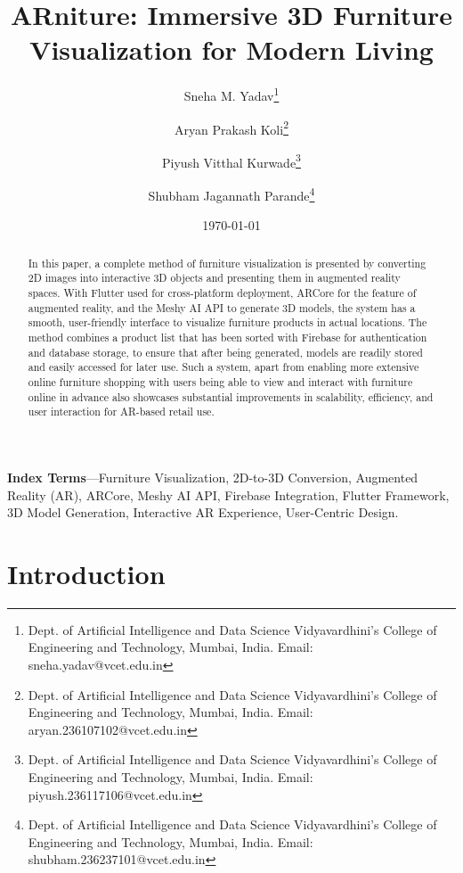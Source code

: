 \documentclass[12pt, a4paper]{article}
\title{ARniture: Immersive 3D Furniture Visualization for Modern Living}
\author{Sneha M. Yadav\thanks{Dept. of Artificial Intelligence and Data Science Vidyavardhini's College of Engineering and Technology, Mumbai, India. Email: sneha.yadav@vcet.edu.in} \and Aryan Prakash Koli\thanks{Dept. of Artificial Intelligence and Data Science Vidyavardhini's College of Engineering and Technology, Mumbai, India. Email: aryan.236107102@vcet.edu.in} \and Piyush Vitthal Kurwade\thanks{Dept. of Artificial Intelligence and Data Science Vidyavardhini's College of Engineering and Technology, Mumbai, India. Email: piyush.236117106@vcet.edu.in} \and Shubham Jagannath Parande\thanks{Dept. of Artificial Intelligence and Data Science Vidyavardhini's College of Engineering and Technology, Mumbai, India. Email: shubham.236237101@vcet.edu.in}}
\date{\today}
\begin{document}
\maketitle

\begin{abstract}
In this paper, a complete method of furniture visualization is presented by converting 2D images into interactive 3D objects and presenting them in augmented reality spaces. With Flutter used for cross-platform deployment, ARCore for the feature of augmented reality, and the Meshy AI API to generate 3D models, the system has a smooth, user-friendly interface to visualize furniture products in actual locations. The method combines a product list that has been sorted with Firebase for authentication and database storage, to ensure that after being generated, models are readily stored and easily accessed for later use. Such a system, apart from enabling more extensive online furniture shopping with users being able to view and interact with furniture online in advance also showcases substantial improvements in scalability, efficiency, and user interaction for AR-based retail use.
\end{abstract}

\noindent\textbf{Index Terms}---Furniture Visualization, 2D-to-3D Conversion, Augmented Reality (AR), ARCore, Meshy AI API, Firebase Integration, Flutter Framework, 3D Model Generation, Interactive AR Experience, User-Centric Design.

\section{Introduction}
\end{document}

